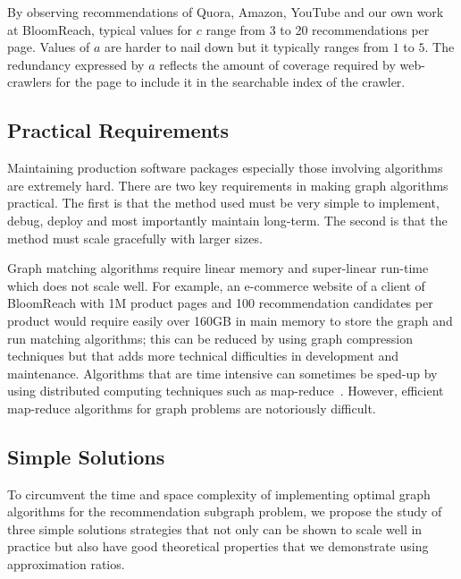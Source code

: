 By observing recommendations of Quora, Amazon, YouTube and our own
work at BloomReach, typical values for $c$ range from 3 to 20
recommendations per page. Values of $a$ are harder to nail down but it
typically ranges from $1$ to $5$. The redundancy expressed by $a$
reflects the amount of coverage required by web-crawlers for the page
to include it in the searchable index of the crawler. \vs

\subsection{Practical Requirements}

Maintaining production software packages especially those involving algorithms
are extremely hard. There are two key requirements in making graph algorithms
practical. The first is that the method used must be very simple to
implement, debug, deploy and most importantly maintain long-term. The second is that the method must scale
gracefully with larger sizes. \vs

Graph matching algorithms require linear memory and super-linear run-time
which does not scale well. For example, an e-commerce website of a
client of BloomReach with 1M product pages and 100 recommendation
candidates per product would require easily over 160GB in main memory to store the graph
and run matching algorithms; this can be reduced by using graph
compression techniques but that adds more technical difficulties in
development and maintenance. Algorithms that are time intensive
can sometimes be sped-up by using distributed computing techniques such as
map-reduce~\cite{DeanGhemawat2004}. However, efficient map-reduce
algorithms for graph problems are notoriously difficult. \vs

\subsection{Simple Solutions}

To circumvent the time and space complexity of implementing optimal
graph algorithms for the recommendation subgraph problem, we propose
the study of three simple solutions strategies that not only can be
shown to scale well in practice but also have good theoretical
properties that we demonstrate using approximation ratios.

